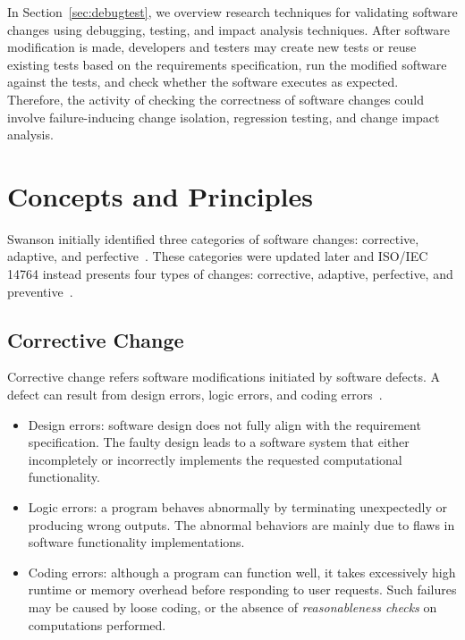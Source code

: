 \documentclass[runningheads,a4paper]{llncs}
\begin{document}
In Section~\ref{sec:debugtest}, we overview research techniques for validating software changes using debugging, testing, and impact analysis techniques. After software modification is made, developers and testers may create new tests or reuse existing tests based on the requirements specification, run the modified software against the tests, and check whether the software executes as expected. Therefore, the activity of checking the correctness of software changes could involve failure-inducing change isolation, regression testing, and change impact analysis. 


\section{Concepts and Principles}
\label{sec:concepts}
\label{sec:classification} 
Swanson initially identified three categories of software changes: corrective, adaptive, and perfective~\cite{Swanson1976:Dimension}. These categories were updated later and ISO/IEC 14764 instead presents four types of changes: corrective, adaptive, perfective, and preventive~\cite{iso}.

\subsection{Corrective Change} 
Corrective change refers software modifications initiated by software defects. A defect can result from design errors, logic errors, and coding errors~\cite{Longstreet1990:smc}.

\begin{itemize}
\item Design errors: software design does not fully align with the requirement specification. The faulty design leads to a software system that either incompletely or incorrectly implements the requested computational functionality. 
\item Logic errors: a program behaves abnormally by terminating unexpectedly or producing wrong outputs. The abnormal behaviors are mainly due to flaws in software functionality implementations.
\item Coding errors: although a program can function well, it takes excessively high runtime or memory overhead before responding to user requests. Such failures may be caused by loose coding, or the absence of {\em reasonableness checks} on computations performed.
\end{itemize}
\end{document}
